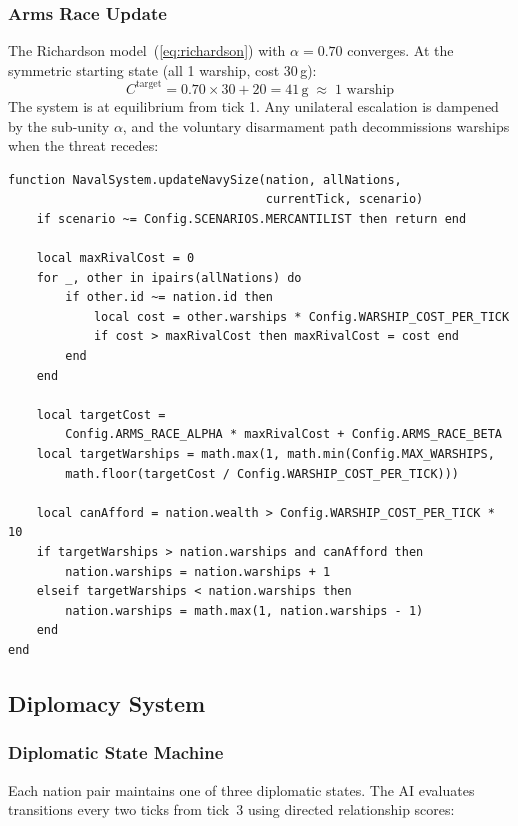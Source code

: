 \documentclass[12pt,a4paper]{article}
\begin{document}
\subsubsection{Arms Race Update}

The Richardson model~(\ref{eq:richardson}) with $\alpha = 0.70$ converges. At the symmetric starting state (all 1 warship, cost 30\,g):
\[
    C^{\text{target}} = 0.70 \times 30 + 20 = 41\,\text{g} \;\approx\; 1\text{ warship}
\]
The system is at equilibrium from tick 1. Any unilateral escalation is dampened by the sub-unity $\alpha$, and the voluntary disarmament path decommissions warships when the threat recedes:

\begin{lstlisting}[caption={Arms race update --- NavalSystem.lua}]
function NavalSystem.updateNavySize(nation, allNations,
                                    currentTick, scenario)
    if scenario ~= Config.SCENARIOS.MERCANTILIST then return end

    local maxRivalCost = 0
    for _, other in ipairs(allNations) do
        if other.id ~= nation.id then
            local cost = other.warships * Config.WARSHIP_COST_PER_TICK
            if cost > maxRivalCost then maxRivalCost = cost end
        end
    end

    local targetCost =
        Config.ARMS_RACE_ALPHA * maxRivalCost + Config.ARMS_RACE_BETA
    local targetWarships = math.max(1, math.min(Config.MAX_WARSHIPS,
        math.floor(targetCost / Config.WARSHIP_COST_PER_TICK)))

    local canAfford = nation.wealth > Config.WARSHIP_COST_PER_TICK * 10
    if targetWarships > nation.warships and canAfford then
        nation.warships = nation.warships + 1
    elseif targetWarships < nation.warships then
        nation.warships = math.max(1, nation.warships - 1)
    end
end
\end{lstlisting}

\subsection{Diplomacy System}

\subsubsection{Diplomatic State Machine}

Each nation pair maintains one of three diplomatic states. The AI evaluates transitions every two ticks from tick~3 using directed relationship scores:
\end{document}
